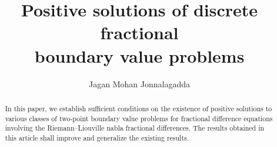\documentclass[12pt]{llncs}
\begin{document}
\fi

\title{Positive solutions of discrete fractional\\ boundary value problems}

\author{Jagan Mohan Jonnalagadda}

\maketitle

\begin{abstract}
In this paper, we establish sufficient conditions on the existence of positive solutions to various classes of two-point boundary value problems for fractional difference equations involving the Riemann--Liouville nabla fractional differences. The results obtained in this article shall improve and generalize the existing results.

\end{abstract}

\vspace{2cm}

\end{document}
